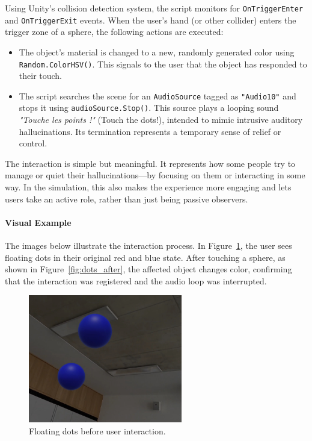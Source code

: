 Using Unity's collision detection system, the script monitors for \texttt{OnTriggerEnter} and \texttt{OnTriggerExit} events. When the user's hand (or other collider) enters the trigger zone of a sphere, the following actions are executed:

\begin{itemize}
    \item The object's material is changed to a new, randomly generated color using \texttt{Random.ColorHSV()}. This signals to the user that the object has responded to their touch.
    \item The script searches the scene for an \texttt{AudioSource} tagged as \texttt{"Audio10"} and stops it using \texttt{audioSource.Stop()}. This source plays a looping sound \textit{"Touche les points !"} (Touch the dots!), intended to mimic intrusive auditory hallucinations. Its termination represents a temporary sense of relief or control.
\end{itemize}

The interaction is simple but meaningful. It represents how some people try to manage or quiet their hallucinations—by focusing on them or interacting in some way. In the simulation, this also makes the experience more engaging and lets users take an active role, rather than just being passive observers.

\paragraph{Visual Example}
The images below illustrate the interaction process. In Figure~\ref{fig:dots_before}, the user sees floating dots in their original red and blue state. After touching a sphere, as shown in Figure~\ref{fig:dots_after}, the affected object changes color, confirming that the interaction was registered and the audio loop was interrupted.

\begin{figure}[H]
    \centering
    \includegraphics[width=0.6\textwidth]{../../Figures/dots-video.jpg}
    \caption{Floating dots before user interaction.}
    \label{fig:dots_before}
\end{figure}

